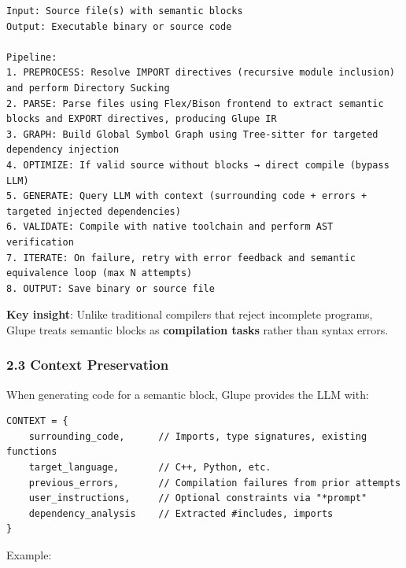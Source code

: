 \documentclass[11pt, a4paper]{article}
\begin{document}
\begin{verbatim}
Input: Source file(s) with semantic blocks
Output: Executable binary or source code

Pipeline:
1. PREPROCESS: Resolve IMPORT directives (recursive module inclusion) and perform Directory Sucking
2. PARSE: Parse files using Flex/Bison frontend to extract semantic blocks and EXPORT directives, producing Glupe IR
3. GRAPH: Build Global Symbol Graph using Tree-sitter for targeted dependency injection
4. OPTIMIZE: If valid source without blocks → direct compile (bypass LLM)
5. GENERATE: Query LLM with context (surrounding code + errors + targeted injected dependencies)
6. VALIDATE: Compile with native toolchain and perform AST verification
7. ITERATE: On failure, retry with error feedback and semantic equivalence loop (max N attempts)
8. OUTPUT: Save binary or source file
\end{verbatim}

\textbf{Key insight}: Unlike traditional compilers that reject
incomplete programs, Glupe treats semantic blocks as \textbf{compilation
tasks} rather than syntax errors.

\subsubsection{2.3 Context Preservation}\label{context-preservation}

When generating code for a semantic block, Glupe provides the LLM with:

\begin{verbatim}
CONTEXT = {
    surrounding_code,      // Imports, type signatures, existing functions
    target_language,       // C++, Python, etc.
    previous_errors,       // Compilation failures from prior attempts
    user_instructions,     // Optional constraints via "*prompt"
    dependency_analysis    // Extracted #includes, imports
}
\end{verbatim}

Example:
\end{document}
